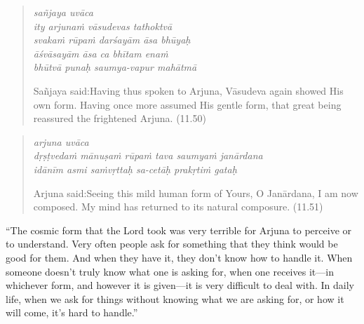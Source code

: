 \documentclass[12pt, twoside, openright]{memoir}
\begin{document}
\par
\begin{verse}
\textit{sañjaya uvāca} \\
\textit{ity arjunaṁ vāsudevas tathoktvā} \\
\textit{svakaṁ rūpaṁ darśayām āsa bhūyaḥ} \\
\textit{āśvāsayām āsa ca bhītam enaṁ} \\
\textit{bhūtvā punaḥ saumya-vapur mahātmā}

\noindent \quad Sañjaya said:\linebreak Having thus spoken to Arjuna, Vāsudeva again showed His own form. Having once more assumed His gentle form, that great being reassured the frightened Arjuna. (11.50)
\end{verse}
\par



\par
\begin{verse}
\textit{arjuna uvāca} \\
\textit{dṛṣṭvedaṁ mānuṣaṁ rūpaṁ tava saumyaṁ janārdana} \\
\textit{idānīm asmi saṁvṛttaḥ sa-cetāḥ prakṛtiṁ gataḥ}

\noindent \quad Arjuna said:\linebreak Seeing this mild human form of Yours, O Janārdana, I am now composed. My mind has returned to its natural composure. (11.51)
\end{verse}
\par


\enquote{The cosmic form that the Lord took was very terrible for Arjuna to perceive or to understand. Very often people ask for something that they think would be good for them. And when they have it, they don’t know how to handle it. When someone doesn’t truly know what one is asking for, when one receives it---in whichever form, and however it is given---it is very difficult to deal with. In daily life, when we ask for things without knowing what we are asking for, or how it will come, it’s hard to handle.}
\end{document}
